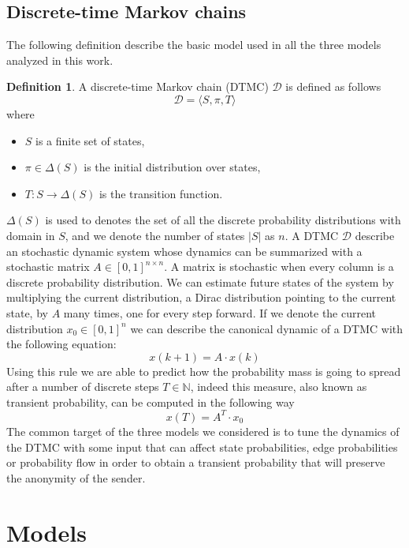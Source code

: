 \documentclass[a4paper, 11pt]{article}
\theoremstyle{definition}
\newtheorem{definition}{Definition}[section]
\theoremstyle{remark}
\begin{document}
\subsection{Discrete-time Markov chains} %
\label{sub:discrete_time_markov_chains}

The following definition describe the basic model used in all the three models analyzed in this work.

\begin{definition}\label{def:dtmc}
A discrete-time Markov chain (DTMC) $\mathcal{D}$ is defined as follows
$$ \mathcal{D} = \langle S, \pi, T \rangle $$
where
\begin{itemize}
	\item $S$ is a finite set of states,
	\item $\pi \in \Delta(S)$ is the initial distribution over states,
	\item $T: S \rightarrow \Delta(S)$ is the transition function.
\end{itemize}
\end{definition}

$\Delta(S)$ is used to denotes the set of all the discrete probability distributions with domain in $S$, and we denote the number of states $|S|$ as $n$. A DTMC $\mathcal{D}$ describe an stochastic dynamic system whose dynamics can be summarized with a stochastic matrix $A \in [0,1]^{n \times n}$. A matrix is stochastic when every column is a discrete probability distribution. We can estimate future states of the system by multiplying the current distribution, a Dirac distribution pointing to the current state, by $A$ many times, one for every step forward. If we denote the current distribution $x_0 \in [0,1]^n$ we can describe the canonical dynamic of a DTMC with the following equation:
$$ x(k+1) = A \cdot x(k) $$
Using this rule we are able to predict how the probability mass is going to spread after a number of discrete steps $T \in \mathbb{N}$, indeed this measure, also known as transient probability, can be computed in the following way
$$ x(T) = A^T \cdot x_0 $$
The common target of the three models we considered is to tune the dynamics of the DTMC with some input that can affect state probabilities, edge probabilities or probability flow in order to obtain a transient probability that will preserve the anonymity of the sender.

\section{Models} %
\label{sec:models}
\end{document}
